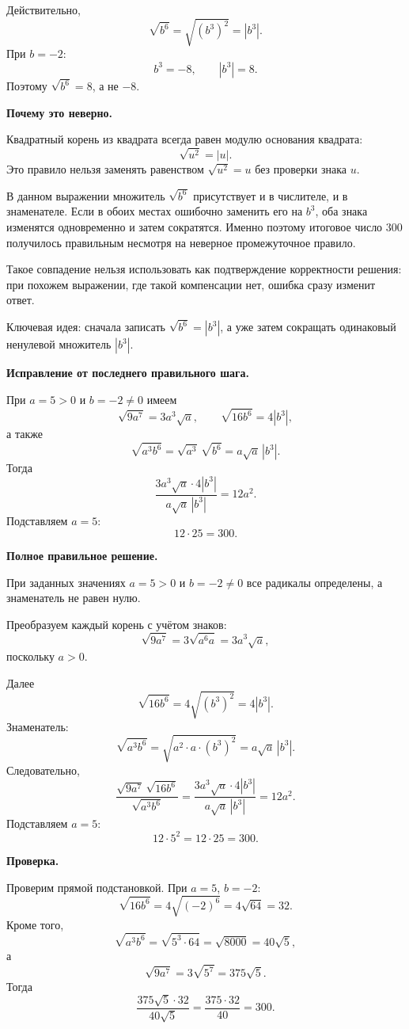 \documentclass[12pt,a4paper]{article}
\begin{document}
Действительно,
\[
\sqrt{b^6}=\sqrt{(b^3)^2}=|b^3|.
\]
При $b=-2$:
\[
b^3=-8,
\qquad
|b^3|=8.
\]
Поэтому $\sqrt{b^6}=8$, а не $-8$.

\textbf{Почему это неверно.}

Квадратный корень из квадрата всегда равен модулю основания квадрата:
\[
\sqrt{u^2}=|u|.
\]
Это правило нельзя заменять равенством $\sqrt{u^2}=u$ без проверки знака $u$.

В данном выражении множитель $\sqrt{b^6}$ присутствует и в числителе, и в знаменателе. Если в обоих местах ошибочно заменить его на $b^3$, оба знака изменятся одновременно и затем сократятся. Именно поэтому итоговое число $300$ получилось правильным несмотря на неверное промежуточное правило.

Такое совпадение нельзя использовать как подтверждение корректности решения: при похожем выражении, где такой компенсации нет, ошибка сразу изменит ответ.

\textcolor{blue!60!black}{Ключевая идея:} сначала записать $\sqrt{b^6}=|b^3|$, а уже затем сокращать одинаковый ненулевой множитель $|b^3|$.

\textbf{Исправление от последнего правильного шага.}

При $a=5>0$ и $b=-2\ne0$ имеем
\[
\sqrt{9a^7}=3a^3\sqrt a,
\qquad
\sqrt{16b^6}=4|b^3|,
\]
а также
\[
\sqrt{a^3b^6}
=
\sqrt{a^3}\,\sqrt{b^6}
=
a\sqrt a\,|b^3|.
\]
Тогда
\[
\frac{3a^3\sqrt a\cdot4|b^3|}{a\sqrt a\,|b^3|}
=
12a^2.
\]
Подставляем $a=5$:
\[
12\cdot25=300.
\]

\textbf{Полное правильное решение.}

При заданных значениях $a=5>0$ и $b=-2\ne0$ все радикалы определены, а знаменатель не равен нулю.

Преобразуем каждый корень с учётом знаков:
\[
\sqrt{9a^7}
=
3\sqrt{a^6a}
=
3a^3\sqrt a,
\]
поскольку $a>0$.

Далее
\[
\sqrt{16b^6}
=
4\sqrt{(b^3)^2}
=
4|b^3|.
\]
Знаменатель:
\[
\sqrt{a^3b^6}
=
\sqrt{a^2\cdot a\cdot(b^3)^2}
=
a\sqrt a\,|b^3|.
\]
Следовательно,
\[
\frac{\sqrt{9a^7}\,\sqrt{16b^6}}{\sqrt{a^3b^6}}
=
\frac{3a^3\sqrt a\cdot4|b^3|}{a\sqrt a\,|b^3|}
=
12a^2.
\]
Подставляем $a=5$:
\[
12\cdot5^2=12\cdot25=300.
\]

\textbf{Проверка.}

Проверим прямой подстановкой. При $a=5$, $b=-2$:
\[
\sqrt{16b^6}=4\sqrt{(-2)^6}=4\sqrt{64}=32.
\]
Кроме того,
\[
\sqrt{a^3b^6}
=
\sqrt{5^3\cdot64}
=
\sqrt{8000}
=
40\sqrt5,
\]
а
\[
\sqrt{9a^7}
=
3\sqrt{5^7}
=
375\sqrt5.
\]
Тогда
\[
\frac{375\sqrt5\cdot32}{40\sqrt5}
=
\frac{375\cdot32}{40}
=
300.
\]
\end{document}

